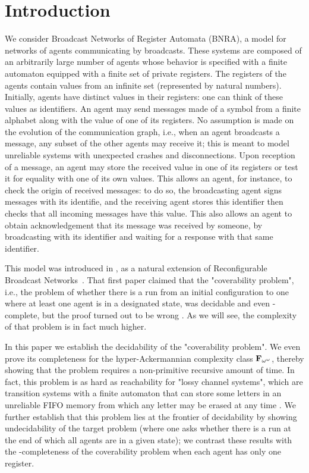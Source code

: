\section{Introduction}

We consider Broadcast Networks of Register Automata (BNRA), a model for networks of agents communicating by broadcasts. These systems are composed of an arbitrarily large number of agents whose behavior is specified with a finite automaton equipped with a finite set of private registers. The registers of the agents contain values from an infinite set (represented by natural numbers). Initially, agents have distinct values in their registers: one can think of these values as identifiers. An agent may send messages made of a symbol from a finite alphabet along with the value of one of its registers. No assumption is made on the evolution of the communication graph, i.e., when an agent broadcasts a message, any subset of the other agents may receive it; this is meant to model unreliable systems with unexpected crashes and disconnections. Upon reception of a message, an agent may store the received value in one of its registers or test it for equality with one of its own values. 
This allows an agent, for instance, to check the origin of received messages: to do so, the broadcasting agent signs messages with its identifie, and the receiving agent stores this identifier then checks that all incoming messages have this value. This also allows an agent to obtain acknowledgement that its message was received by someone, by broadcasting with its identifier and waiting for a response with that same identifier.

This model was introduced in \cite{DelzannoST13}, as a natural extension of Reconfigurable Broadcast Networks~\cite{DelzannoSZ2010Adhoc}. That first paper claimed that the "coverability problem", i.e., the problem of whether there is a run from an initial configuration to one where at least one agent is in a designated state, was decidable and even \PSPACE-complete, but the proof turned out to be wrong \cite{ArnaudErratum}. As we will see, the complexity of that problem is in fact much higher.

In this paper we establish the decidability of the "coverability problem". We even prove its completeness for the hyper-Ackermannian complexity class $\mathbf{F}_{\omega^\omega}$, thereby showing that the problem requires a non-primitive recursive amount of time. In fact, this problem is as hard as reachability for "lossy channel systems", which are transition systems with a finite automaton that can store some letters in an unreliable FIFO memory from which any letter may be erased at any time \cite{AbdullaJ1996verif, Schnoebelen2002verifying,ChambartS08ordinal}. 
We further establish that this problem lies at the frontier of decidability by showing undecidability of the target problem (where one asks whether there is a run at the end of which all agents are in a given state); we contrast these results with the \NP-completeness of the coverability problem when each agent has only one register. 

